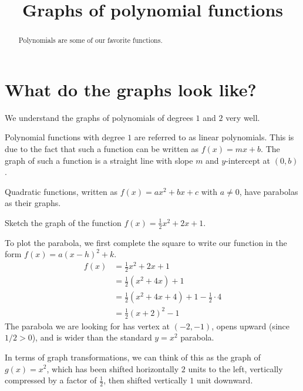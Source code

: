 \documentclass{ximera}
\title[Dig-In:]{Graphs of polynomial functions}
\begin{document}
\begin{abstract}
  Polynomials are some of our favorite functions. 
\end{abstract}
\maketitle


\section{What do the graphs look like?}
We understand the graphs of polynomials of degrees $1$ and $2$ very well.

Polynomial functions with degree $1$ are referred to as linear polynomials.  This is due to the fact
that such a function can be written as $f(x) = mx + b$.  The graph of such a function is a straight line
with slope $m$ and $y$-intercept at $(0,b)$.

Quadratic functions, written as $f(x) = ax^2 + bx + c$ with $a \ne 0$, have parabolas as their graphs.
\begin{example}
	Sketch the graph of the function $f(x) = \frac{1}{2} x^2 + 2x + 1$.
	\begin{explanation}
		To plot the parabola, we first complete the square to write our function in the form $f(x) = a(x-h)^2 +k$.
		\begin{align*}
			f(x) &= \frac{1}{2} x^2 + 2x + 1 \\
				&= \frac{1}{2} \left( x^2+ 4x \right) + 1\\
				&= \frac{1}{2}\left( x^2 + 4x + 4\right) + 1 - \frac{1}{2} \cdot 4\\
				&= \frac{1}{2} \left( x+2 \right)^2 -1
		\end{align*} 
		The parabola we are looking for has vertex at $(-2, -1)$, opens upward (since $1/2 > 0$), and is wider than the standard
		$y=x^2$ parabola.
		
		In terms of graph transformations, we can think of this as the graph of $g(x) = x^2$, which has been shifted horizontally $2$ units to the left,
		vertically compressed by a factor of $\frac{1}{2}$, then shifted vertically $1$ unit downward.
	\end{explanation}
\end{example}
\end{document}
